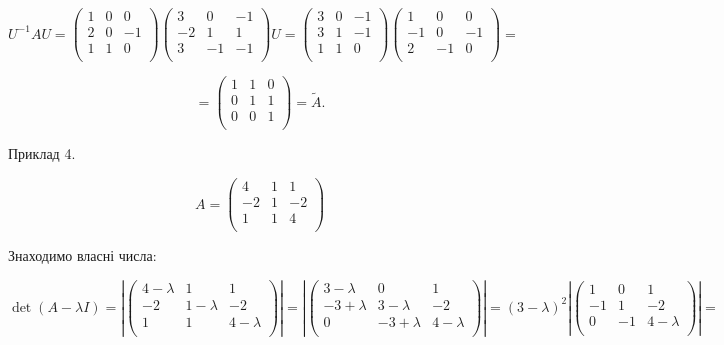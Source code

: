 $$U^{-1} A U = \begin{pmatrix}
	1 & 0 & 0 \\
	2 & 0 & -1 \\
	1 & 1 & 0 \\
\end{pmatrix} \begin{pmatrix}
	3  & 0  & -1 \\
	-2 & 1  &  1 \\
	3  & -1 & -1 \\
\end{pmatrix} U = \begin{pmatrix}
	3 & 0 & -1 \\
	3 & 1 & -1 \\
	1 & 1 & 0  \\
\end{pmatrix} \begin{pmatrix}
	1  & 0  & 0  \\
	-1 & 0  & -1 \\
	2  & -1 & 0  \\
\end{pmatrix}  = $$

$$= \begin{pmatrix}
	1 & 1 & 0 \\
	0 & 1 & 1 \\
	0 & 0 & 1 \\
\end{pmatrix} = \tilde{A}.$$

Приклад 4.

$$A = \begin{pmatrix}
	4  & 1 & 1  \\
	-2 & 1 & -2 \\
	1  & 1 & 4  \\
\end{pmatrix} $$

Знаходимо власні числа:

$$\det(A-\lambda I) = \left| \begin{pmatrix}
	4 - \lambda & 1           & 1 \\
	-2          & 1 - \lambda & -2 \\
	1           & 1           & 4 -\lambda \\
\end{pmatrix} \right| = \left| \begin{pmatrix}
	3 - \lambda & 0           & 1 \\
	-3 +\lambda & 3 - \lambda & -2 \\
	0           & -3 +\lambda & 4 -\lambda \\
\end{pmatrix} \right| = (3 - \lambda)^2 \left| \begin{pmatrix}
	1  & 0  & 1 \\
	-1 & 1  & -2 \\
	0  & -1 & 4 -\lambda \\
\end{pmatrix} \right| = $$


